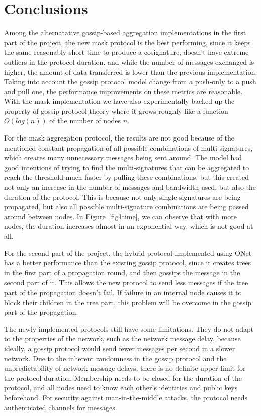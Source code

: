 \section{Conclusions}
Among the alternatative gossip-based aggregation implementations in the first part of the project, the new mask protocol is the best performing, since it keeps the same reasonably short time to produce a cosignature, doesn't have extreme outliers in the protocol duration. and while the number of messages exchanged is higher, the amount of data transferred is lower than the previous implementation.
Taking into account the gossip protocol model change from a push-only to a push and pull one, the performance improvements on these metrics are reasonable.
With the mask implementation we have also experimentally backed up the property of gossip protocol theory where it grows roughly like a function $O(log(n))$ of the number of nodes $n$.

For the mask aggregation protocol, the results are not good because of the mentioned constant propagation of all possible combinations of multi-signatures, which creates many unnecessary messages being sent around. The model had good intentions of trying to find the multi-signatures that can be aggregated to reach the threshold much faster by pulling these combinations, but this created not only an increase in the number of messages and bandwidth used, but also the duration of the protocol. This is because not only single signatures are being propagated, but also all possible multi-signature combinations are being passed around between nodes. In Figure~\ref{fig1time}, we can observe that with more nodes, the duration increases almost in an exponential way, which is not good at all.

For the second part of the project, the hybrid protocol implemented using ONet has a better performance than the existing gossip protocol, since it creates trees in the first part of a propagation round, and then gossips the message in the second part of it. This allows the new protocol to send less messages if the tree part of the propagation doesn't fail. If failure in an internal node causes it to block their children in the tree part, this problem will be overcome in the gossip part of the propagation.

The newly implemented protocols still have some limitations.
They do not adapt to the properties of the network, such as the network message delay, because ideally, a gossip protocol would send fewer messages per second in a slower network.
Due to the inherent randomness in the gossip protocol and the unpredictability of network message delays, there is no definite upper limit for the protocol duration.
Membership needs to be closed for the duration of the protocol, and all nodes need to know each other's identities and public keys beforehand.
For security against man-in-the-middle attacks, the protocol needs authenticated channels for messages.

